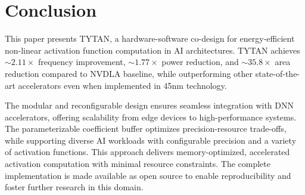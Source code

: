 \documentclass[runningheads]{llncs}
\begin{document}

\section{Conclusion}
    This paper presents TYTAN, a hardware-software co-design for energy-efficient non-linear activation function computation in AI architectures. TYTAN achieves $\sim2.11\times$ frequency improvement, $\sim1.77\times$ power reduction, and $\sim35.8\times$ area reduction compared to NVDLA baseline, while outperforming other state-of-the-art accelerators even when implemented in 45nm technology.
    
    The modular and reconfigurable design ensures seamless integration with DNN accelerators, offering scalability from edge devices to high-performance systems. The parameterizable coefficient buffer optimizes precision-resource trade-offs, while supporting diverse AI workloads with configurable precision and a variety of activation functions. This approach delivers memory-optimized, accelerated activation computation with minimal resource constraints.
    The complete implementation is made available as open source \cite{tytan2025} to enable reproducibility and foster further research in this domain.




\end{document}
